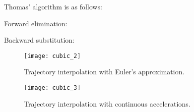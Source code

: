 Thomas' algorithm is as follows:

\begin{minipage}{0.5\textwidth}
Forward elimination:
\begin{center}
\begin{algorithmic}
    \EndFor
\end{algorithmic}
\end{center}
\end{minipage}
\begin{minipage}{0.5\textwidth}
Backward substitution:
\begin{center}
\begin{algorithmic}
    \EndFor
\end{algorithmic}
\end{center}
\end{minipage}


\begin{figure}[h]
\begin{minipage}{0.5\textwidth}
\centering
\texttt{[image: cubic\_2]}
\caption{Trajectory interpolation with Euler's approximation.}
\end{minipage}
\begin{minipage}{0.5\textwidth}
\centering
\texttt{[image: cubic\_3]}
\caption{Trajectory interpolation with continuous accelerations.}
\end{minipage}
\end{figure}